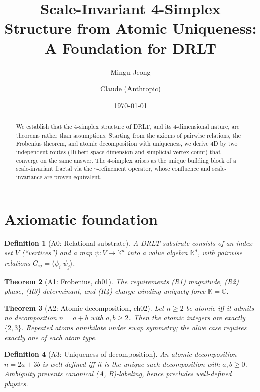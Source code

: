 \documentclass[11pt]{article}
\title{Scale-Invariant 4-Simplex Structure from Atomic Uniqueness:\\
A Foundation for DRLT}
\author{Mingu Jeong \and Claude (Anthropic)}
\date{\today}
\newtheorem{theorem}{Theorem}
\newtheorem{definition}[theorem]{Definition}
\begin{document}
\maketitle

\begin{abstract}
We establish that the 4-simplex structure of DRLT, and its
4-dimensional nature, are theorems rather than assumptions. Starting
from the axioms of pairwise relations, the Frobenius theorem, and
atomic decomposition with uniqueness, we derive 4D by two independent
routes (Hilbert space dimension and simplicial vertex count) that
converge on the same answer. The 4-simplex arises as the unique
building block of a scale-invariant fractal via the $\gamma$-refinement
operator, whose confluence and scale-invariance are proven equivalent.
\end{abstract}

\section{Axiomatic foundation}

\begin{definition}[A0: Relational substrate]
A DRLT substrate consists of an index set $V$ (``vertices'') and
a map $\psi: V \to \mathbb{K}^d$ into a value algebra $\mathbb{K}^d$,
with pairwise relations $G_{ij} = \langle \psi_i | \psi_j \rangle$.
\end{definition}

\begin{theorem}[A1: Frobenius, ch01]
\label{thm:frobenius}
The requirements (R1) magnitude, (R2) phase, (R3) determinant, and
(R4) charge winding uniquely force $\mathbb{K} = \mathbb{C}$.
\end{theorem}

\begin{theorem}[A2: Atomic decomposition, ch02]
\label{thm:atomic}
Let $n \geq 2$ be atomic iff it admits no decomposition $n = a + b$
with $a, b \geq 2$. Then the atomic integers are exactly $\{2, 3\}$.
Repeated atoms annihilate under swap symmetry; the alive case
requires exactly one of each atom type.
\end{theorem}

\begin{definition}[A3: Uniqueness of decomposition]
\label{def:uniqueness}
An atomic decomposition $n = 2a + 3b$ is \emph{well-defined} iff
it is the unique such decomposition with $a, b \geq 0$. Ambiguity
prevents canonical (A, B)-labeling, hence precludes well-defined
physics.
\end{definition}
\end{document}
